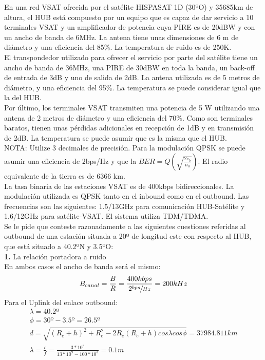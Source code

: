 \begin{exercise}[5]
	En una red VSAT ofrecida por el satélite HISPASAT 1D (30ºO) y 35685km de altura, el HUB está compuesto por un equipo que es capaz de dar servicio a 10 terminales VSAT y un amplificador de potencia cuya PIRE es de 20dBW y con un ancho de banda de 6MHz. La antena tiene unas dimensiones de 6 m de diámetro y una eficiencia del 85\%. La temperatura de ruido es de 250K.\\
	El transpondedor utilizado para ofrecer el servicio por parte del satélite tiene un ancho de banda de 36MHz, una PIRE de 30dBW en toda la banda, un back-off de entrada de 3dB y uno de salida de 2dB. La antena utilizada es de 5 metros de diámetro, y una eficiencia del 95\%. La temperatura se puede considerar igual que la del HUB.\\
	Por último, los terminales VSAT transmiten una potencia de 5 W utilizando una antena de 2 metros de diámetro y una eficiencia del 70\%. Como son terminales baratos, tienen unas pérdidas adicionales en recepción de 1dB y en transmisión de 2dB. La temperatura se puede asumir que es la misma que el HUB.\\
	NOTA: Utilize 3 decimales de precisión. Para la modulación QPSK se puede asumir una eficiencia de 2bps/Hz y que la $BER=Q(\sqrt{\frac{2e_b}{n_0}})$. El radio equivalente de la tierra es de 6366 km.\\
	La tasa binaria de las estaciones VSAT es de 400kbps bidireccionales. La modulación utilizada es QPSK tanto en el inbound como en el outbound. Las frecuencias son las siguientes: 1.5/13GHz para comunicación HUB-Satélite y 1.6/12GHz para satélite-VSAT. El sistema utiliza TDM/TDMA.\\
	Se le pide que conteste razonadamente a las siguientes cuestiones referidas al outbound de una estación situada a 20º de longitud este con respecto al HUB, que está situado a 40.2ºN y 3.5ºO: \\
	\textbf{1.} La relación portadora a ruido\\
	En ambos casos el ancho de banda será el mismo:
	\[B_{canal}=\frac{B}{R}=\frac{400kbps}{2\sfrac{bps}{Hz}}=200kHz\]
	Para el Uplink del enlace outbound:
	\begin{gather*}
		\lambda=40.2º\\
		\phi=30º-3.5º=26.5º\\
		d=\sqrt{(R_e+h)^2+R_e^2-2R_e(R_e+h)cos\lambda cos\phi}=37984.811km\\
		\lambda=\frac{c}{f}=\frac{3*10^8}{13*10^9-100*10^3}=0.1m\\

\end{gather*}
\end{exercise}
